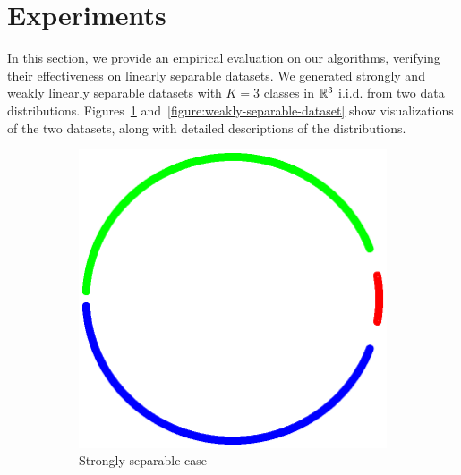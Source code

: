 \section{Experiments}
\label{section:experiments}

In this section, we provide an empirical evaluation on our algorithms, verifying
their effectiveness on linearly separable datasets. We generated strongly and
weakly linearly separable datasets with $K=3$ classes in $\mathbb{R}^3$ i.i.d. from two
data distributions. Figures~\ref{figure:strongly-separable-dataset}
and~\ref{figure:weakly-separable-dataset} show visualizations of the two
datasets, along with detailed descriptions of the distributions.

\begin{figure}[h]
\centering
\begin{subfigure}[b]{0.23\textwidth}
\captionsetup{justification=centering}
\begin{center}
\hspace*{-0.3cm} \includegraphics[width=1.15\textwidth, trim={0, 0cm, 0, 0}, clip]{figures/strong_points}
\caption{Strongly separable case}
\label{figure:strongly-separable-dataset}
\end{center}
\end{subfigure}
\hfill
\begin{subfigure}[b]{0.23\textwidth}
\captionsetup{justification=centering}

\end{subfigure}
\end{figure}
